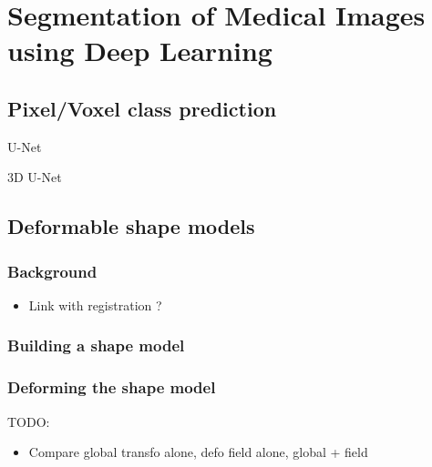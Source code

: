 \chapter{Segmentation of Medical Images using Deep Learning}
\label{chap:seg}

\minitoc

\newpage

\section{Pixel/Voxel class prediction}

U-Net~\textcite{ronneberger2015MICCAI}

3D U-Net~\textcite{cicek2016MICCAI}

\section{Deformable shape models}

\subsection{Background}

\begin{itemize}
    \item Link with registration ?
\end{itemize}

\subsection{Building a shape model}

\subsection{Deforming the shape model}

TODO:
\begin{itemize}
    \item Compare global transfo alone, defo field alone, global + field
\end{itemize}



